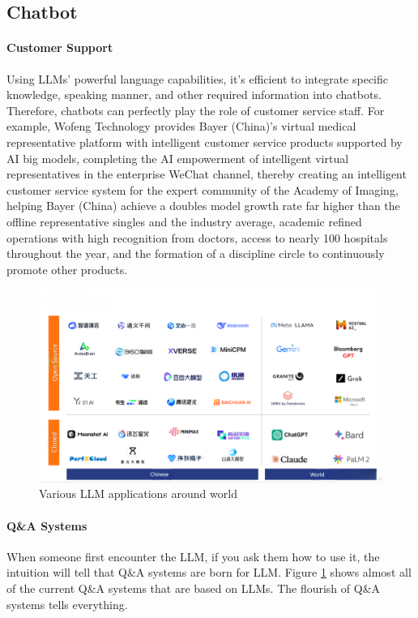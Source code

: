 \documentclass[fleqn,10pt]{SelfArx} %
\begin{document}
\subsection{Chatbot}

\paragraph{Customer Support} Using LLMs' powerful language capabilities, it's efficient to integrate specific knowledge, speaking manner, and other required information into chatbots. Therefore, chatbots can perfectly play the role of customer service staff. For example, Wofeng Technology provides Bayer (China)'s virtual medical representative platform with intelligent customer service products supported by AI big models, completing the AI empowerment of intelligent virtual representatives in the enterprise WeChat channel, thereby creating an intelligent customer service system for the expert community of the Academy of Imaging, helping Bayer (China) achieve a doubles model growth rate far higher than the offline representative singles and the industry average, academic refined operations with high recognition from doctors, access to nearly 100 hospitals throughout the year, and the formation of a discipline circle to continuously promote other products.

\begin{figure}[ht]\centering
	\includegraphics[width=\linewidth]{Figures/LLMs.png}
	\caption{Various LLM applications around world}
	\label{fig:llmapp}
\end{figure}

\paragraph{Q\&A Systems} When someone first encounter the LLM, if you ask them how to use it, the intuition will tell that Q\&A systems are born for LLM. Figure \ref{fig:llmapp} shows almost all of the current Q\&A systems that are based on LLMs. The flourish of Q\&A systems tells everything.
\end{document}
